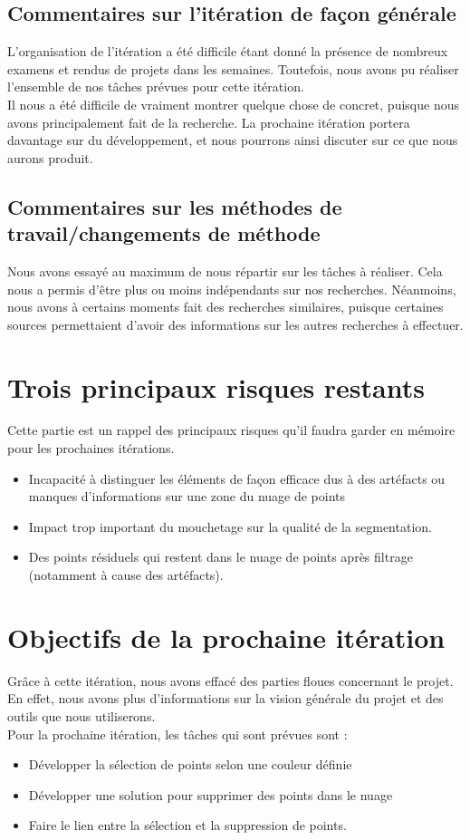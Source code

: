 \documentclass[12pt,titlepage,french]{article}
\begin{document}
\subsection{Commentaires sur l'itération de façon générale}
L'organisation de l'itération a été difficile étant donné la présence de nombreux examens et rendus de projets dans les semaines. Toutefois, nous avons pu réaliser l'ensemble de nos tâches prévues pour cette itération.\\
Il nous a été difficile de vraiment montrer quelque chose de concret, puisque nous avons principalement fait de la recherche. La prochaine itération portera davantage sur du développement, et nous pourrons ainsi discuter sur ce que nous aurons produit.

\subsection{Commentaires sur les méthodes de travail/changements de méthode}
Nous avons essayé au maximum de nous répartir sur les tâches à réaliser. Cela nous a permis d'être plus ou moins indépendants sur nos recherches. Néanmoins, nous avons à certains moments fait des recherches similaires, puisque certaines sources permettaient d'avoir des informations sur les autres recherches à effectuer.

\section{Trois principaux risques restants}
Cette partie est un rappel des principaux risques qu'il faudra garder en mémoire pour les prochaines itérations.

\begin{itemize}
  \item Incapacité à distinguer les éléments de façon efficace dus à des artéfacts ou manques d'informations sur une zone du nuage de points
  \item Impact trop important du mouchetage sur la qualité de la segmentation.
  \item Des points résiduels qui restent dans le nuage de points après filtrage (notamment à cause des artéfacts).
\end{itemize}

\section{Objectifs de la prochaine itération}
Grâce à cette itération, nous avons effacé des parties floues concernant le projet. En effet, nous avons plus d'informations sur la vision générale du projet et des outils que nous utiliserons. \\
Pour la prochaine itération, les tâches qui sont prévues sont :
\begin{itemize}
  \item Développer la sélection de points selon une couleur définie
  \item Développer une solution pour supprimer des points dans le nuage
  \item Faire le lien entre la sélection et la suppression de points.
\end{itemize}
\end{document}
